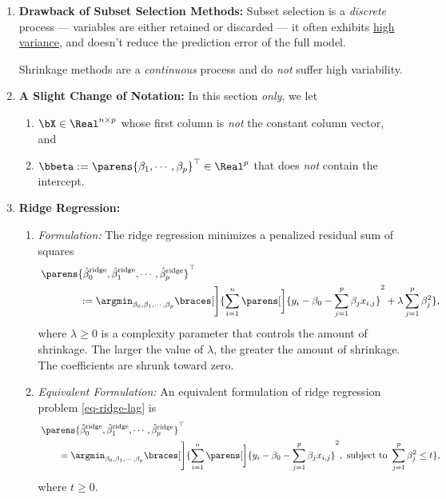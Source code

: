 \documentclass[12pt]{article}
\begin{document}
\begin{enumerate}[label=\textbf{\arabic*.}]
	
	\item \textbf{Drawback of Subset Selection Methods:} Subset selection is a \textit{discrete} process --- variables are either retained or discarded --- it often exhibits \underline{high variance}, and doesn't reduce the prediction error of the full model. 
	
	Shrinkage methods are a \emph{continuous} process and do \emph{not} suffer high variability. 
	
	\item \textbf{A Slight Change of Notation:} In this section \emph{only}, we let 
	\begin{enumerate}
		\item $\bX \in \Real^{n \times p}$ whose first column is \emph{not} the constant column vector, and 
		\item $\bbeta := \parens{\beta_1, \cdots, \beta_p}^\top \in \Real^p$ that does \emph{not} contain the intercept. 
	\end{enumerate}
	
	\item \textbf{Ridge Regression:} 
	\begin{enumerate}
		\item \textit{Formulation:} The ridge regression minimizes a penalized residual sum of squares 
		\begin{align}\label{eq-ridge-lag}
			& \, \parens{\hat{\beta}^{\mathrm{ridge}}_0, \hat{\beta}^{\mathrm{ridge}}_1, \cdots, \hat{\beta}^{\mathrm{ridge}}_p}^\top \nonumber \\ 
			& \qquad \qquad := \argmin_{\beta_0, \beta_1, \cdots, \beta_p} \braces[\Bigg]{ \sum_{i=1}^n \parens[\bigg]{y_i - \beta_0 - \sum_{j=1}^p \beta_j x_{i,j}}^2 + \lambda \sum_{j=1}^p \beta_j^2}, 
		\end{align}
		where $\lambda \ge 0$ is a complexity parameter that controls the amount of shrinkage. The larger the value of $\lambda$, the greater the amount of shrinkage. The coefficients are shrunk toward zero. 
		
		\item \textit{Equivalent Formulation:} An equivalent formulation of ridge regression problem \eqref{eq-ridge-lag} is 
		\begin{equation}\label{eq-ridge-con}
			\begin{aligned}
				& \, \parens{\hat{\beta}^{\mathrm{ridge}}_0, \hat{\beta}^{\mathrm{ridge}}_1, \cdots, \hat{\beta}^{\mathrm{ridge}}_p}^\top \nonumber \\ 
				& \qquad = \argmin_{\beta_0, \beta_1, \cdots, \beta_p} \braces[\Bigg]{ \sum_{i=1}^n \parens[\bigg]{y_i - \beta_0 - \sum_{j=1}^p \beta_j x_{i,j}}^2, \text{ subject to } \sum_{j=1}^p \beta_j^2 \le t}, 
			\end{aligned}
		\end{equation}
		where $t \ge 0$. 
		

\end{enumerate}
\end{enumerate}
\end{document}
